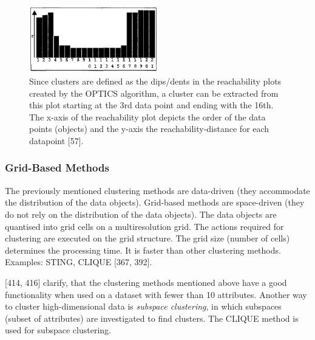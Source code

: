 \begin{figure}
  \centering
  \includegraphics[width=0.5\textwidth]{./images/clusterExtractionOPTICS.png}
  \caption{Since clusters are defined as the dips/dents in the reachability plots created by the OPTICS algorithm, a cluster can be extracted from this plot starting at the 3rd data point and ending with the 16th. The x-axis of the reachability plot depicts the order of the data points (objects) and the y-axis the reachability-distance for each datapoint \autocite{OPTICS}[57].}
  \label{figure:clusterExtractionOPTICS}
\end{figure}


 

  \subsubsection{Grid-Based Methods}
  The previously mentioned clustering methods are data-driven (they accommodate the distribution of the data objects). Grid-based methods are space-driven (they do not rely on the distribution of the data objects). The data objects are quantised into grid cells on a multiresolution grid. The actions required for clustering are executed on the grid structure. The grid size (number of cells) determines the processing time. It is faster than other clustering methods. Examples: STING, CLIQUE \autocite{han2011data}[367, 392].
  
  

  \vspace{5mm} %
\textcite{han2011data}[414, 416] clarify, that the clustering methods mentioned above have a good functionality when used on a dataset with fewer than 10 attributes. Another way to cluster high-dimensional data is \textit{subspace clustering}, in which subspaces (subset of attributes) are investigated to find clusters. The CLIQUE method is used for subspace clustering. 


